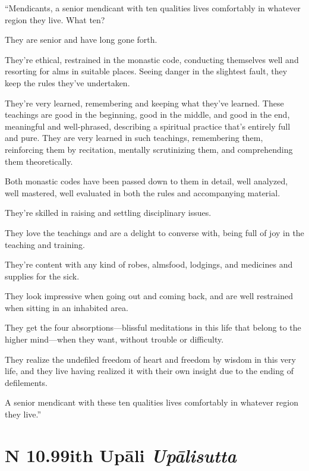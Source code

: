 \documentclass[12pt,openany]{book}%
\newcommand*{\suttatitleacronym}[1]{\smaller[2]{#1}\vspace*{.3em}}
\newcommand*{\suttatitletranslation}[1]{\linebreak{#1}}
\newcommand*{\suttatitleroot}[1]{\linebreak\smaller[2]\itshape{#1}}
\newcommand*{\tocacronym}[1]{\hspace*{-3.3em}{#1}\quad}
\newcommand*{\toctranslation}[1]{#1}
\newcommand*{\tocroot}[1]{(\textit{#1})}
\begin{document}
“Mendicants, a senior mendicant with ten qualities lives comfortably in whatever region they live. What ten? 

They are senior and have long gone forth. 

They’re ethical, restrained in the monastic code, conducting themselves well and resorting for alms in suitable places. Seeing danger in the slightest fault, they keep the rules they’ve undertaken. 

They’re very learned, remembering and keeping what they’ve learned. These teachings are good in the beginning, good in the middle, and good in the end, meaningful and well-phrased, describing a spiritual practice that’s entirely full and pure. They are very learned in such teachings, remembering them, reinforcing them by recitation, mentally scrutinizing them, and comprehending them theoretically. 

Both monastic codes have been passed down to them in detail, well analyzed, well mastered, well evaluated in both the rules and accompanying material. 

They’re skilled in raising and settling disciplinary issues. 

They love the teachings and are a delight to converse with, being full of joy in the teaching and training. 

They’re content with any kind of robes, almsfood, lodgings, and medicines and supplies for the sick. 

They look impressive when going out and coming back, and are well restrained when sitting in an inhabited area. 

They get the four absorptions—blissful meditations in this life that belong to the higher mind—when they want, without trouble or difficulty. 

They realize the undefiled freedom of heart and freedom by wisdom in this very life, and they live having realized it with their own insight due to the ending of defilements. 

A senior mendicant with these ten qualities lives comfortably in whatever region they live.” 

%
\section*{{\suttatitleacronym AN 10.99}{\suttatitletranslation With Upāli }{\suttatitleroot Upālisutta}}
\addcontentsline{toc}{section}{\tocacronym{AN 10.99} \toctranslation{With Upāli } \tocroot{Upālisutta}}
\end{document}
